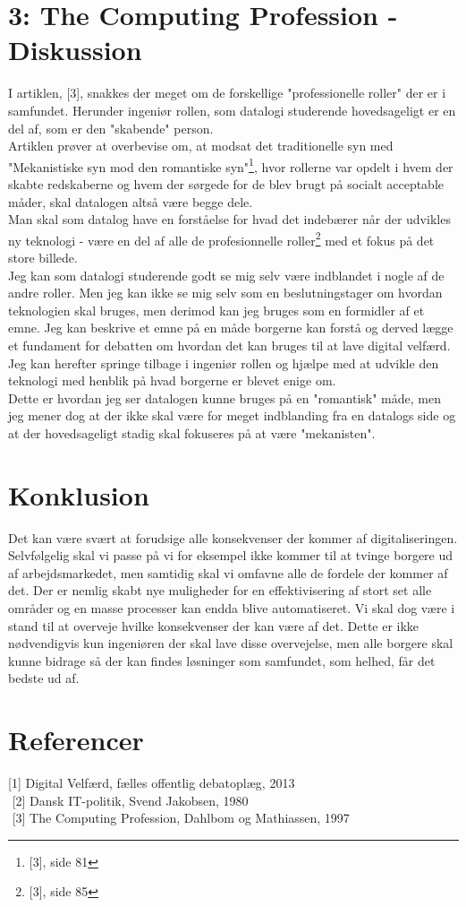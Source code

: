\documentclass[12pt]{article}
\begin{document}
\section*{3: The Computing Profession - Diskussion}
I artiklen, [3], snakkes der meget om de forskellige "professionelle roller" der er i samfundet. Herunder ingeniør rollen, som datalogi studerende hovedsageligt er en del af, som er den "skabende" person.\\
Artiklen prøver at overbevise om, at modsat det traditionelle syn med "Mekanistiske syn mod den romantiske syn"\footnote{[3], side 81}, hvor rollerne var opdelt i hvem der skabte redskaberne og hvem der sørgede for de blev brugt på socialt acceptable måder, skal datalogen altså være begge dele.\\
Man skal som datalog have en forståelse for hvad det indebærer når der udvikles ny teknologi - være en del af alle de profesionnelle roller\footnote{[3], side 85} med et fokus på det store billede.\\
Jeg kan som datalogi studerende godt se mig selv være indblandet i nogle af de andre roller. Men jeg kan ikke se mig selv som en beslutningstager om hvordan teknologien skal bruges, men derimod kan jeg bruges som en formidler af et emne. Jeg kan beskrive et emne på en måde borgerne kan forstå og derved lægge et fundament for debatten om hvordan det kan bruges til at lave digital velfærd.\\
Jeg kan herefter springe tilbage i ingeniør rollen og hjælpe med at udvikle den teknologi med henblik på hvad borgerne er blevet enige om.\\
Dette er hvordan jeg ser datalogen kunne bruges på en "romantisk" måde, men jeg mener dog at der ikke skal være for meget indblanding fra en datalogs side og at der hovedsageligt stadig skal fokuseres på at være "mekanisten".

\section*{Konklusion}
Det kan være svært at forudsige alle konsekvenser der kommer af digitaliseringen. Selvfølgelig skal vi passe på vi for eksempel ikke kommer til at tvinge borgere ud af arbejdsmarkedet, men samtidig skal vi omfavne alle de fordele der kommer af det. Der er nemlig skabt nye muligheder for en effektivisering af stort set alle områder og en masse processer kan endda blive automatiseret. Vi skal dog være i stand til at overveje hvilke konsekvenser der kan være af det. Dette er ikke nødvendigvis kun ingeniøren der skal lave disse overvejelse, men alle borgere skal kunne bidrage så der kan findes løsninger som samfundet, som helhed, får det bedste ud af.

\section*{Referencer}
[1] Digital Velfærd, fælles offentlig debatoplæg, 2013 \\
$ $
[2] Dansk IT-politik, Svend Jakobsen, 1980 \\
$ $
[3] The Computing Profession, Dahlbom og Mathiassen, 1997
\end{document}
